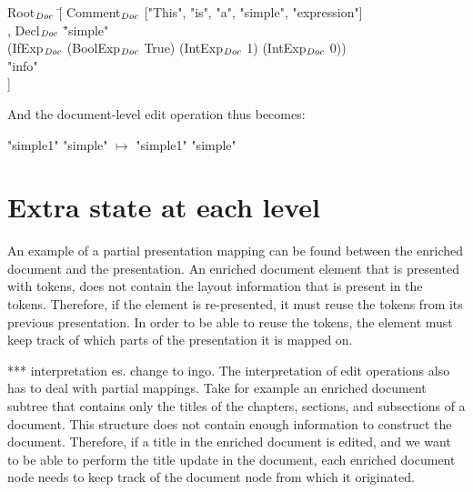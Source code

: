 \documentclass{speauth}
\begin{document}
\small \ttfamily
\begin{tabbing}
Root$_{\mathit{Doc}}$ \= [ Comment$_{\mathit{Doc}}$ ["This", "is", "a", "simple", "expression"] \\
       \> , Decl$_{\mathit{Doc}}$ \= "simple" \\
       \>                        \>(IfExp$_{\mathit{Doc}}$ (BoolExp$_{\mathit{Doc}}$ True) (IntExp$_{\mathit{Doc}}$ 1) (IntExp$_{\mathit{Doc}}$ 0))\\
       \>                       \> "info"\\
       \> ] 
\end{tabbing}
\rmfamily \normalsize

And the document-level edit operation thus becomes:

\small \ttfamily
\begin{tabbing}
 \ttfamily "simple1"  \ttfamily  "simple" $\mapsto$  \ttfamily  "simple1"  \ttfamily  "simple"
\end{tabbing}
\rmfamily \normalsize






%																
%																
%																
\bc
\section{Extra state at each level} \label{sect:archExtraState}




An example of a partial presentation mapping can be found between the enriched document and the presentation. An enriched document element that is presented with tokens, does not contain the layout information that is present in the tokens. Therefore, if the element is re-presented, it must reuse the tokens from its previous presentation. In order to be able to reuse the tokens, the element must keep track of which parts of the presentation it is mapped on.

*** interpretation es. change to ingo.
The interpretation of edit operations also has to deal with partial mappings. Take for example an enriched document subtree that contains only the titles of the chapters, sections, and subsections of a document. This structure does not contain enough information to construct the document. Therefore, if a title in the enriched document is edited, and we want to be able to perform the title update in the document, each enriched document node needs to keep track of the document node from which it originated.
\end{document}
